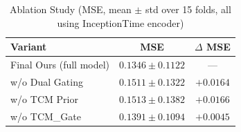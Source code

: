 \documentclass{article}
\begin{document}
\begin{table}[htbp]
\centering
\caption{Ablation Study (MSE, mean $\pm$ std over 15 folds, all using InceptionTime encoder)}
\label{tab:ablation}
\begin{tabular}{lcc}
\toprule
\textbf{Variant} & \textbf{MSE} & \textbf{$\Delta$ MSE} \\
\midrule
Final Ours (full model) & $0.1346 \pm 0.1122$ & --- \\
w/o Dual Gating & $0.1511 \pm 0.1322$ & $+0.0164$ \\
w/o TCM Prior & $0.1513 \pm 0.1382$ & $+0.0166$ \\
w/o TCM\_Gate & $0.1391 \pm 0.1094$ & $+0.0045$ \\
\bottomrule
\end{tabular}
\end{table}
\end{document}
